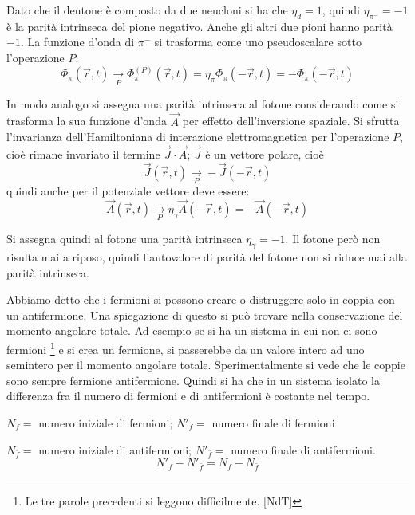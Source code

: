Dato che il deutone è composto da due neucloni si ha che $\eta_d = 1$, quindi 
$\eta_{\pi^-} = -1$ è la parità intrinseca del pione
negativo. Anche gli altri due pioni hanno parità $-1$. La funzione d'onda di 
$\pi^-$ si trasforma come uno pseudoscalare sotto
l'operazione $P$:
\begin{equation*}
\Phi_{\pi}(\vec{r},t) \xrightarrow[P] \quad \Phi_{\pi}^{(P)}(\vec{r},t) = 
\eta_{\pi} \Phi_{\pi}(-\vec{r},t) =
-\Phi_{\pi}(-\vec{r},t)
\end{equation*}


In modo analogo si assegna una parità intrinseca al fotone considerando come 
si trasforma la sua funzione d'onda $\vec{A}$ per
effetto dell'inversione spaziale. Si sfrutta l'invarianza dell'Hamiltoniana di 
interazione elettromagnetica per l'operazione $P$,
cioè rimane invariato il termine $\vec{J}\cdot\vec{A}$; $\vec{J}$ è un 
vettore polare, cioè
\begin{equation*}
 \vec{J}(\vec{r},t) \xrightarrow[P]{} -\vec{J}(-\vec{r},t)
\end{equation*}
quindi anche per il potenziale vettore deve essere:
\begin{equation*}
 \vec{A}(\vec{r},t) \xrightarrow[P]{} \eta_{\gamma}\vec{A}(-\vec{r},t) = 
-\vec{A}(-\vec{r},t)
\end{equation*}

Si assegna quindi al fotone una parità intrinseca $\eta_{\gamma} = -1$. Il 
fotone però non risulta mai a riposo, quindi
l'autovalore di parità del fotone non si riduce mai alla parità intrinseca.

Abbiamo detto che i fermioni si possono creare o distruggere solo in coppia con 
un antifermione. Una spiegazione di questo si può
trovare nella conservazione del momento angolare totale. Ad esempio se si ha un 
sistema in cui non ci sono fermioni \footnote{Le
tre parole precedenti si leggono difficilmente. [NdT]} e si crea un fermione, 
si passerebbe da un valore intero ad uno semintero per il
momento angolare totale.
Sperimentalmente si vede che le coppie sono sempre fermione antifermione. 
Quindi si ha che in un sistema isolato la differenza
fra il numero di fermioni e di antifermioni è costante nel tempo.

$N_f =$ numero iniziale di fermioni; $N'_f =$ numero finale di fermioni

$N_{\bar{f}} =$ numero iniziale di antifermioni; $N'_{\bar{f}} =$ numero finale 
di antifermioni.
\begin{equation*}
 N'_f - N'_{\bar{f}} = N_f - N_{\bar{f}}
\end{equation*}


